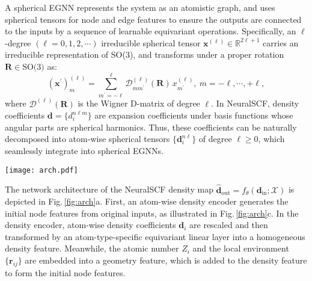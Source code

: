 \documentclass[%
reprint,
superscriptaddress,
bibnotes,
amsmath,amssymb,
aps,
floatfix, %
]{revtex4-2}
\begin{document}
A spherical EGNN represents the system as an atomistic graph, and uses spherical tensors for node and edge features to ensure the outputs are connected to the inputs by a sequence of learnable equivariant operations. Specifically, an $\ell$-degree $(\ell = 0, 1, 2, \cdots)$ irreducible spherical tensor $\mathbf{x}^{(\ell)} \in \mathbb{R}^{2\ell+1}$ carries an irreducible representation of SO(3), and transforms under a proper rotation $\mathbf{R} \in \text{SO(3)}$ as:
\begin{equation}
  (\mathbf{x}^\prime)^{(\ell)}_m = \sum_{m^\prime = -\ell}^\ell \mathcal{D}^{(\ell)}_{mm^\prime}(\mathbf{R})\, x^{(\ell)}_{m^\prime}, ~ m = -\ell, \cdots, +\ell,
  \label{eq:irrep}
\end{equation}
where $\mathcal{D}^{(\ell)}(\mathbf{R})$ is the Wigner D-matrix of degree $\ell$. In NeuralSCF, density coefficients $\mathbf{d} = \{d_i^{n\ell m}\}$ are expansion coefficients under basis functions whose angular parts are spherical harmonics. Thus, these coefficients can be naturally decomposed into atom-wise spherical tensors $\{\mathbf{d}_{i}^{n\ell}\}$ of degree $\ell \ge 0$, which seamlessly integrate into spherical EGNNs.

\begin{figure*}[!ht]
  \texttt{[image: arch.pdf]}
  \caption{\textbf{Network architecture.} \textbf{(a)} Network architecture of the proposed NeuralSCF density map $\hat{\mathbf{d}}_\text{out} = f_{\theta}(\mathbf{d}_\text{in};\mathcal{X})$. \textbf{(b)} Network architecture of DensFormer, an end-to-end baseline model $\hat{\mathbf{d}} = g_{\theta}(\mathcal{X})$ that directly predicts self-consistent density from atomic configurations, sharing the same architecture as the NeuralSCF density map except for the input layer. \textbf{(c)} The density encoder transforms input atom-wise density coefficients, atom type, and the local environment into homogeneous input node features $\mathbf{x}_i^{(0)}$. Here, ``FFN'' stands for feed forward network, ``$\oplus$'' denotes concatenation, and ``$+$'' denotes element-wise addition. \textbf{(d)} The density decoder transforms output node features $\mathbf{x}_i^{(N)}$ into output atom-wise density coefficients.}
  \label{fig:arch}
\end{figure*}

The network architecture of the NeuralSCF density map $\hat{\mathbf{d}}_\text{out} = f_{\theta}(\mathbf{d}_\text{in};\mathcal{X})$ is depicted in Fig.\,\ref{fig:arch}a. First, an atom-wise density encoder generates the initial node features from original inputs, as illustrated in Fig.\,\ref{fig:arch}c. In the density encoder, atom-wise density coefficients $\mathbf{d}_i$ are rescaled and then transformed by an atom-type-specific equivariant linear layer into a homogeneous density feature. Meanwhile, the atomic number $Z_i$ and the local environment $\{\bm{r}_{ij}\}$ are embedded into a geometry feature, which is added to the density feature to form the initial node features. 
\end{document}
